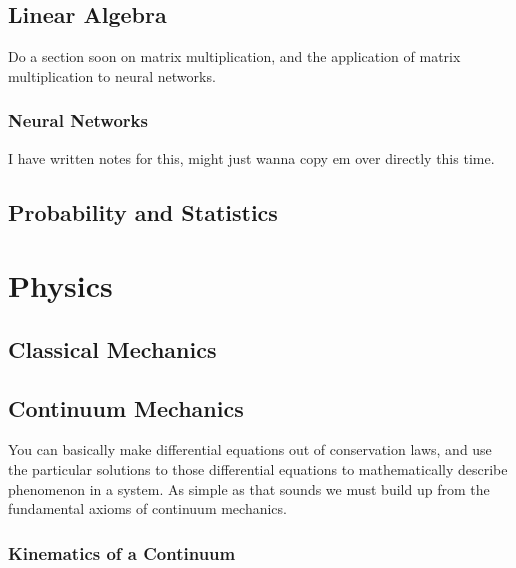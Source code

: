 \documentclass{article}
\begin{document}
\subsection{Linear Algebra}

Do a section soon on matrix multiplication, and the application of matrix multiplication to neural networks. 

\subsubsection{Neural Networks}

I have written notes for this, might just wanna copy em over directly this time. 

\subsection{Probability and Statistics}


\section{Physics}
\subsection{Classical Mechanics}

\subsection{Continuum Mechanics}

You can basically make differential equations out of conservation laws, and use the particular solutions to those differential equations to mathematically describe phenomenon in a system. As simple as that sounds we must build up from the fundamental axioms of continuum mechanics. 

\subsubsection{Kinematics of a Continuum}
\end{document}
